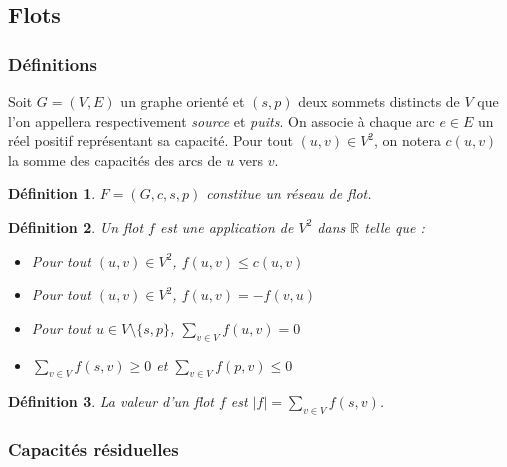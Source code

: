 \documentclass[11pt,a4paper]{article}
\newtheorem*{definition}{Définition}
\begin{document}
  \subsection{Flots}
    \subsubsection{Définitions}

Soit \(G=(V,E)\) un graphe orienté et \((s,p)\) deux sommets distincts de \(V\) que l'on appellera respectivement \textit{source} et \textit{puits}. On associe à chaque arc \(e \in E\) un réel positif représentant sa capacité. Pour tout \((u,v) \in V^2\), on notera \(c(u,v)\) la somme des capacités des arcs de \(u\) vers \(v\).

\begin{definition}
  \(F = (G,c,s,p)\) constitue un réseau de flot.
\end{definition}

\begin{definition}
  Un flot \(f\) est une application de \(V^2\) dans \(\mathbb{R}\) telle que :
  \begin{itemize}
    \item Pour tout \((u,v) \in V^2\), \(f(u,v) \leq c(u,v)\)
    \item Pour tout \((u,v) \in V^2\), \(f(u,v) = -f(v,u)\)
    \item Pour tout \(u \in V \setminus \{s,p\}\), \(\sum\limits_{v \in V} f(u,v) = 0\)
    \item \(\sum\limits_{v \in V} f(s,v) \geq 0\) et \(\sum\limits_{v \in V} f(p,v) \leq 0\)
  \end{itemize}
\end{definition}

\begin{definition}
  La valeur d'un flot \(f\) est \(|f| = \sum\limits_{v \in V} f(s,v)\).
\end{definition}


    \subsubsection{Capacités résiduelles}
\end{document}

